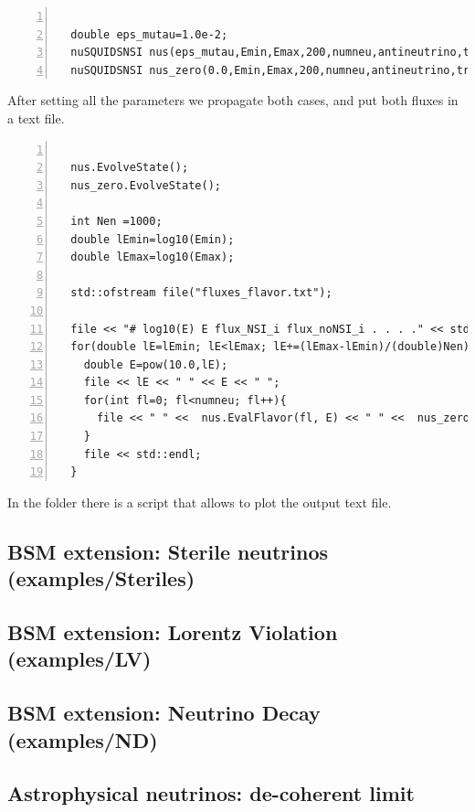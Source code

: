 \begin{lstlisting}[frame=leftline, numbers =
  left,breaklines=true,label = ex:sin1,firstnumber=last]

  double eps_mutau=1.0e-2;
  nuSQUIDSNSI nus(eps_mutau,Emin,Emax,200,numneu,antineutrino,true,false);
  nuSQUIDSNSI nus_zero(0.0,Emin,Emax,200,numneu,antineutrino,true,false);
\end{lstlisting}

After setting all the parameters we propagate both cases, and put both
fluxes in a text file.

\begin{lstlisting}[frame=leftline, numbers =
  left,breaklines=true,label = ex:sin1,firstnumber=last]

  nus.EvolveState();
  nus_zero.EvolveState();

  int Nen =1000;
  double lEmin=log10(Emin);
  double lEmax=log10(Emax);
  
  std::ofstream file("fluxes_flavor.txt");

  file << "# log10(E) E flux_NSI_i flux_noNSI_i . . . ." << std::endl;
  for(double lE=lEmin; lE<lEmax; lE+=(lEmax-lEmin)/(double)Nen){
    double E=pow(10.0,lE);
    file << lE << " " << E << " ";
    for(int fl=0; fl<numneu; fl++){
      file << " " <<  nus.EvalFlavor(fl, E) << " " <<  nus_zero.EvalFlavor(fl, E);
    }
    file << std::endl;
  }

\end{lstlisting}

In the folder there is a script that allows to plot the output text
file.


\subsection{BSM extension:  Sterile neutrinos \textnormal{({\ttf examples/Steriles})}}


\subsection{BSM extension: Lorentz Violation \textnormal{({\ttf examples/LV})}}


\subsection{BSM extension: Neutrino Decay \textnormal{({\ttf examples/ND})}}


\subsection{Astrophysical neutrinos: de-coherent limit}


